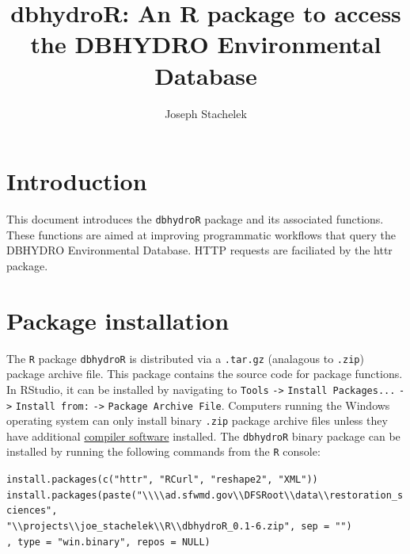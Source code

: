 \documentclass[12pt,notitlepage]{article}
\author{Joseph Stachelek}
\title{dbhydroR: An R package to access the DBHYDRO Environmental Database}
\begin{document}

\maketitle
 


\section{Introduction}

This document introduces the \texttt{dbhydroR} package and its associated functions. These functions are aimed at improving programmatic workflows that query the DBHYDRO Environmental Database. HTTP requests are faciliated by the httr \citep{httr} package. 

\section{Package installation}

The \texttt{R} package \texttt{dbhydroR} is distributed via a \texttt{.tar.gz} (analagous to \texttt{.zip}) package archive file. This package contains the source code for package functions. In RStudio, it can be installed by navigating to \texttt{Tools} \verb|->| \texttt{Install Packages...} \verb|->| \texttt{Install from:} \verb|->| \texttt{Package Archive File}. Computers running the Windows operating system can only install binary \texttt{.zip} package archive files unless they have additional \href{https://cran.r-project.org/bin/windows/Rtools/}{compiler software} installed. The \texttt{dbhydroR} binary package can be installed by running the following commands from the \texttt{R} console:

\vspace{10pt}
\noindent\texttt{install.packages(c("httr", "RCurl", "reshape2", "XML"))}\\
\noindent\texttt{install.packages(paste(}\verb|"\\\\ad.sfwmd.gov\\DFSRoot\\data\\restoration_sciences",|\\
\verb|"\\projects\\joe_stachelek\\R\\dbhydroR_0.1-6.zip", sep = "")|\\
\texttt{, type = "win.binary", repos = NULL)}
\end{document}
